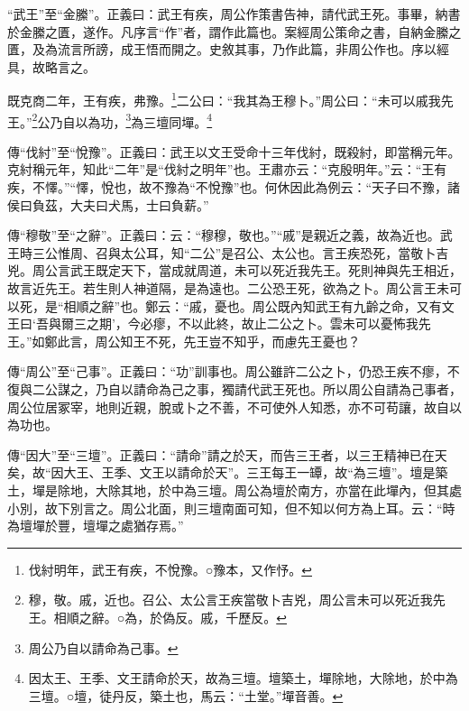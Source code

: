 {\noindent\shu{}\fzkt “武王”至“金縢”。正義曰：武王有疾，周公作策書告神，請代武王死。事畢，納書於金縢之匱，遂作。凡序言“作”者，謂作此篇也。案經周公策命之書，自納金縢之匱，及為流言所謗，成王悟而開之。史敘其事，乃作此篇，非周公作也。序以經具，故略言之。 \par}

既克商二年，王有疾，弗豫。\footnote{伐紂明年，武王有疾，不悅豫。○豫本，又作忬。}二公曰：“我其為王穆卜。”周公曰：“未可以戚我先王。”\footnote{穆，敬。戚，近也。召公、太公言王疾當敬卜吉兇，周公言未可以死近我先王。相順之辭。○為，於偽反。戚，千歷反。}公乃自以為功，\footnote{周公乃自以請命為己事。}為三壇同墠。\footnote{因太王、王季、文王請命於天，故為三壇。壇築土，墠除地，大除地，於中為三壇。○壇，徒丹反，築土也，馬云：“土堂。”墠音善。}

{\noindent\zhuan{}\fzbyks 傳“伐紂”至“悅豫”。正義曰：武王以文王受命十三年伐紂，既殺紂，即當稱元年。克紂稱元年，知此“二年”是“伐紂之明年”也。王肅亦云：“克殷明年。”云：“王有疾，不懌。”“懌，悅也，故不豫為“不悅豫”也。何休因此為例云：“天子曰不豫，諸侯曰負茲，大夫曰犬馬，士曰負薪。” \par}

{\noindent\zhuan{}\fzbyks 傳“穆敬”至“之辭”。正義曰：云：“穆穆，敬也。”“戚”是親近之義，故為近也。武王時三公惟周、召與太公耳，知“二公”是召公、太公也。言王疾恐死，當敬卜吉兇。周公言武王既定天下，當成就周道，未可以死近我先王。死則神與先王相近，故言近先王。若生則人神道隔，是為遠也。二公恐王死，欲為之卜。周公言王未可以死，是“相順之辭”也。鄭云：“戚，憂也。周公既內知武王有九齡之命，又有文王曰‘吾與爾三之期’，今必瘳，不以此終，故止二公之卜。雲未可以憂怖我先王。”如鄭此言，周公知王不死，先王豈不知乎，而慮先王憂也？ \par}

{\noindent\zhuan{}\fzbyks 傳“周公”至“己事”。正義曰：“功”訓事也。周公雖許二公之卜，仍恐王疾不瘳，不復與二公謀之，乃自以請命為己之事，獨請代武王死也。所以周公自請為己事者，周公位居冢宰，地則近親，脫或卜之不善，不可使外人知悉，亦不可苟讓，故自以為功也。 \par}

{\noindent\zhuan{}\fzbyks 傳“因大”至“三壇”。正義曰：“請命”請之於天，而告三王者，以三王精神已在天矣，故“因大王、王季、文王以請命於天”。三王每王一罈，故“為三壇”。壇是築土，墠是除地，大除其地，於中為三壇。周公為壇於南方，亦當在此墠內，但其處小別，故下別言之。周公北面，則三壇南面可知，但不知以何方為上耳。云：“時為壇墠於豐，壇墠之處猶存焉。” \par}

